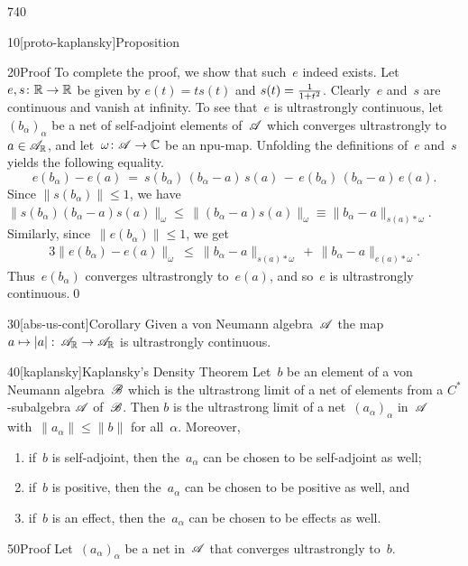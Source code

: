 \begin{parsec}{740}
\begin{point}{10}[proto-kaplansky]{Proposition}
\begin{point}{20}{Proof}
To complete the proof,
we show that such~$e$ indeed exists.
Let $e,s\colon \mathbb{R}\to\mathbb{R}$ 
be given by $e(t)=ts(t)$ and $s(t)=\smash{\frac{1}{1+t^2}}$.
Clearly~$e$ and~$s$
are continuous
and
vanish at infinity.
To see that~$e$ is ultrastrongly continuous,
let $(b_\alpha)_\alpha$ be a net of self-adjoint elements of~$\mathscr{A}$
which converges ultrastrongly to $a\in\mathscr{A}_{\mathbb{R}}$,
and let~$\omega\colon \mathscr{A}\to \mathbb{C}$
be an npu-map. 
Unfolding the definitions
of~$e$ and~$s$ yields
the following equality.
\begin{equation*}
e(b_\alpha)-e(a) \ =\ s(b_\alpha)\,(b_\alpha-a)\,s(a)
\,-\, e(b_\alpha)\,(b_\alpha-a)\,e(a).
\end{equation*}
Since $\|s(b_\alpha)\|\leq 1$,
we have $\|s(b_\alpha)(b_\alpha-a)s(a)\|_\omega 
\leq  \,\|(b_\alpha-a)s(a)\|_\omega
\equiv \|b_\alpha-a\|_{s(a)*\omega}$.
Similarly, since~$\|e(b_\alpha)\|\leq 1$,
we get
\begin{alignat*}{3}
\|e(b_\alpha)-e(a)\|_\omega
\ \leq\ \|b_\alpha-a\|_{s(a)*\omega}\,+\,\|b_\alpha-a\|_{e(a)*\omega}.
\end{alignat*}
Thus~$e(b_\alpha)$ converges ultrastrongly to~$e(a)$,
and so~$e$ is ultrastrongly continuous.\qed
\end{point}
\end{point}

\begin{point}{30}[abs-us-cont]{Corollary}%
Given a von Neumann algebra~$\mathscr{A}$
the map $a\mapsto\left|a\right|\colon\,\mathscr{A}_{\mathbb{R}}\to\mathscr{A}_{\mathbb{R}}$
is ultrastrongly continuous.
\end{point}
\begin{point}{40}[kaplansky]{Kaplansky's Density Theorem}%
Let~$b$ be an element of a von Neumann algebra~$\mathscr{B}$
which is the ultrastrong limit of a net
of elements
from a $C^*$-subalgebra $\mathscr{A}$ of~$\mathscr{B}$.
Then
$b$ is the ultrastrong limit of a net~$(a_\alpha)_\alpha$
in~$\mathscr{A}$ with~$\|a_\alpha\|\leq\|b\|$ for all~$\alpha$.
Moreover,
\begin{enumerate}
\item
if~$b$ is self-adjoint,
then the~$a_\alpha$ can be chosen to be self-adjoint as well;
\item
if~$b$ is positive,
then the~$a_\alpha$ can be chosen to be positive as well, and
\item
if~$b$ is an effect,
then the~$a_\alpha$ can be chosen to be effects as well.
\end{enumerate}
\spacingfix%
\begin{point}{50}{Proof}%
Let~$(a_\alpha)_\alpha$
be a net in~$\mathscr{A}$ that converges ultrastrongly
to~$b$.


\end{point}
\end{point}
\end{parsec}
